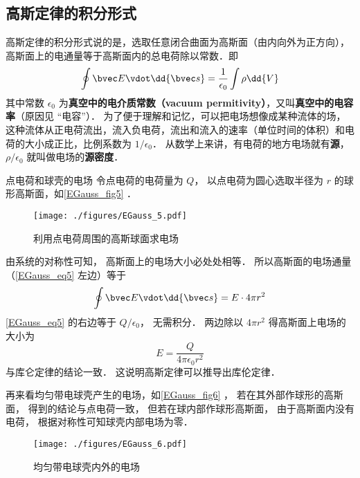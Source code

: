 \subsection{高斯定律的积分形式}

高斯定律的积分形式说的是，选取任意闭合曲面为高斯面（由内向外为正方向），高斯面上的电通量等于高斯面内的总电荷除以常数．即
\begin{equation}\label{EGauss_eq5}
\oint \bvec E \vdot \dd{\bvec s}  = \frac{1}{\epsilon_0} \int \rho \dd{V}
\end{equation} 
其中常数 $\epsilon_0$ 为\textbf{真空中的电介质常数（vacuum permitivity）}，又叫\textbf{真空中的电容率}（原因见 “电容”）． 为了便于理解和记忆，可以把电场想像成某种流体的场，这种流体从正电荷流出，流入负电荷，流出和流入的速率（单位时间的体积）和电荷的大小成正比，比例系数为 $1/\epsilon_0$． 从数学上来讲，有电荷的地方电场就有\textbf{源}， $\rho /\epsilon_0$ 就叫做电场的\textbf{源密度}．

\begin{example}{点电荷和球壳的电场}\label{EGauss_exe1}
令点电荷的电荷量为 $Q$， 以点电荷为圆心选取半径为 $r$ 的球形高斯面，如\autoref{EGauss_fig5} ． 
\begin{figure}[ht]
\centering
\texttt{[image: ./figures/EGauss\_5.pdf]}
\caption{利用点电荷周围的高斯球面求电场} \label{EGauss_fig5}
\end{figure}
由系统的对称性可知， 高斯面上的电场大小必处处相等． 所以高斯面的电场通量（\autoref{EGauss_eq5} 左边）等于
\begin{equation}
\oint \bvec E \vdot \dd{\bvec s} = E \cdot 4\pi r^2
\end{equation}
\autoref{EGauss_eq5} 的右边等于 $Q/\epsilon_0$， 无需积分． 两边除以 $4\pi r^2$ 得高斯面上电场的大小为
\begin{equation}
E = \frac{Q}{4\pi\epsilon_0 r^2}
\end{equation}
与库仑定律的结论一致． 这说明高斯定律可以推导出库伦定律．

再来看均匀带电球壳产生的电场，如\autoref{EGauss_fig6} ， 若在其外部作球形的高斯面， 得到的结论与点电荷一致， 但若在球内部作球形高斯面， 由于高斯面内没有电荷， 根据对称性可知球壳内部电场为零．
\begin{figure}[ht]
\centering
\texttt{[image: ./figures/EGauss\_6.pdf]}
\caption{均匀带电球壳内外的电场} \label{EGauss_fig6}
\end{figure}
\end{example}



